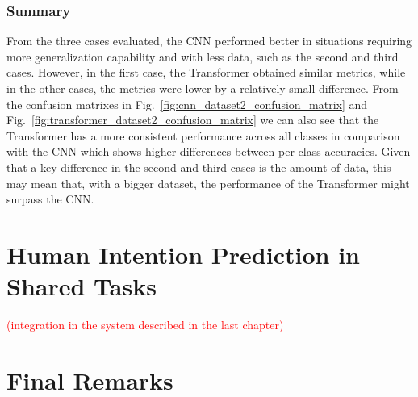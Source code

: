 \subsubsection{Summary}

From the three cases evaluated, the CNN performed better in situations requiring more generalization capability and with less data, such as the second and third cases. However, in the first case, the Transformer obtained similar metrics, while in the other cases, the metrics were lower by a relatively small difference. From the confusion matrixes in Fig.~\ref{fig:cnn_dataset2_confusion_matrix} and Fig.~\ref{fig:transformer_dataset2_confusion_matrix} we can also see that the Transformer has a more consistent performance across all classes in comparison with the CNN which shows higher differences between per-class accuracies. Given that a key difference in the second and third cases is the amount of data, this may mean that, with a bigger dataset, the performance of the Transformer might surpass the CNN.

\section{Human Intention Prediction in Shared Tasks}

\textcolor{red}{(integration in the system described in the last chapter)}

\section{Final Remarks}
